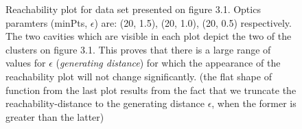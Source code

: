 \begin{figure}
  \centering
  \caption{Reachability plot for data set presented on figure 3.1. Optics
  paramters (minPts, $\epsilon$) are: (20, 1.5), (20, 1.0), (20, 0.5)
  respectively. The two cavities which are visible in each plot depict the two
  of the clusters on figure 3.1. This proves that there is a large range of
  values for $\epsilon$ (\textit{generating distance}) for which the appearance
  of the reachability plot will not change significantly. (the flat shape of function from the last plot
  results from the fact that we truncate the reachability-distance to the 
  generating distance $\epsilon$, when the former is greater than the latter)}
  \label{fig:reachDist}
\end{figure}

